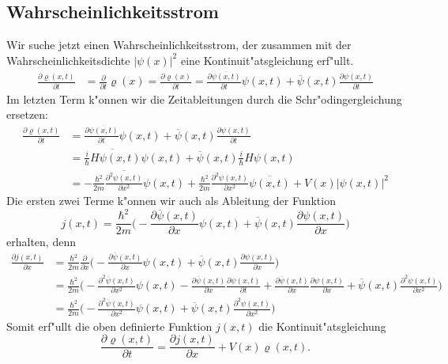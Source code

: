 \subsection{Wahrscheinlichkeitsstrom}
Wir suche jetzt einen Wahrscheinlichkeitsstrom, der zusammen mit
der Wahrscheinlichkeitsdichte $|\psi(x)|^2$ eine Kontinuit"atsgleichung
erf"ullt.
\begin{align*}
\frac{\partial\varrho(x,t)}{\partial t}
&=
\frac{\partial}{\partial t} \varrho(x)
=
\frac{\partial\varrho(x)}{\partial t}
=
\frac{\partial\overline{\psi(x,t)}}{\partial t}\psi(x,t)
+
\overline{\psi}(x,t)\frac{\partial\psi(x,t)}{\partial t}
\end{align*}
Im letzten Term k"onnen wir die Zeitableitungen durch die
Schr"odingergleichung ersetzen:
\begin{align*}
\frac{\partial\varrho(x,t)}{\partial t}
&=
\frac{\partial\overline{\psi(x,t)}}{\partial t}\psi(x,t)
+
\overline{\psi}(x,t)\frac{\partial\psi(x,t)}{\partial t}
\\
&=
\overline{ \frac{i}{\hbar}H \psi(x,t) }\psi(x,t)
+
\overline{\psi}(x,t)\frac{i}{\hbar} H \psi(x,t)
\\
&=
-
\frac{\hbar^2}{2m}\overline{\frac{\partial^2\psi(x,t)}{\partial x^2}}\psi(x,t)
+
\frac{\hbar^2}{2m}\frac{\partial^2\psi(x,t)}{\partial x^2}\overline{\psi(x,t)}
+
V(x)|\psi(x,t)|^2
\end{align*}
Die ersten zwei Terme k"onnen wir auch als Ableitung
der Funktion
\[
j(x,t)=
\frac{\hbar^2}{2m}
\biggl(
-\frac{\partial\overline{\psi}(x,t)}{\partial x}\psi(x,t)
+\overline{\psi}(x,t)\frac{\partial\psi(x,t)}{\partial x}
\biggr)
\]
erhalten, denn
\begin{align*}
\frac{\partial j(x,t)}{\partial x}
&=
\frac{\hbar^2}{2m}
\frac{\partial}{\partial x}
\biggl(
-\frac{\partial\overline{\psi}(x,t)}{\partial x}\psi(x,t)
+\overline{\psi}(x,t)\frac{\partial\psi(x,t)}{\partial x}
\biggr)
\\
&=
\frac{\hbar^2}{2m}
\biggl(
-
\frac{\partial^2\overline{\psi}(x,t)}{\partial x^2}
\psi(x,t)
-
\frac{\partial\overline{\psi}(x,t)}{\partial x}
\frac{\partial\psi(x,t)}{\partial t}
+
\frac{\partial\overline{\psi}(x,t)}{\partial x}
\frac{\partial\psi(x,t)}{\partial x}
+
\overline{\psi}(x,t)
\frac{\partial^2\psi(x,t)}{\partial x^2}
\biggr)
\\
&=
\frac{\hbar^2}{2m}
\biggl(
-
\frac{\partial^2\overline{\psi}(x,t)}{\partial x^2}
\psi(x,t)
+
\overline{\psi}(x,t)
\frac{\partial^2\psi(x,t)}{\partial x^2}
\biggr)
\end{align*}
Somit erf"ullt die oben definierte Funktion $j(x,t)$ die
Kontinuit"atsgleichung
\[
\frac{\partial\varrho(x,t)}{\partial t}
=
\frac{\partial j(x,t)}{\partial x} +V(x)\varrho(x,t).
\]





